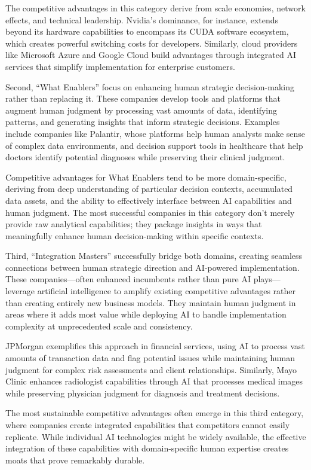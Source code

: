 \documentclass[
  Letterpaper,
]{scrbook}
\begin{document}
The competitive advantages in this category derive from scale economies,
network effects, and technical leadership. Nvidia's dominance, for
instance, extends beyond its hardware capabilities to encompass its CUDA
software ecosystem, which creates powerful switching costs for
developers. Similarly, cloud providers like Microsoft Azure and Google
Cloud build advantages through integrated AI services that simplify
implementation for enterprise customers.

Second, ``What Enablers'' focus on enhancing human strategic
decision-making rather than replacing it. These companies develop tools
and platforms that augment human judgment by processing vast amounts of
data, identifying patterns, and generating insights that inform
strategic decisions. Examples include companies like Palantir, whose
platforms help human analysts make sense of complex data environments,
and decision support tools in healthcare that help doctors identify
potential diagnoses while preserving their clinical judgment.

Competitive advantages for What Enablers tend to be more
domain-specific, deriving from deep understanding of particular decision
contexts, accumulated data assets, and the ability to effectively
interface between AI capabilities and human judgment. The most
successful companies in this category don't merely provide raw
analytical capabilities; they package insights in ways that meaningfully
enhance human decision-making within specific contexts.

Third, ``Integration Masters'' successfully bridge both domains,
creating seamless connections between human strategic direction and
AI-powered implementation. These companies---often enhanced incumbents
rather than pure AI plays---leverage artificial intelligence to amplify
existing competitive advantages rather than creating entirely new
business models. They maintain human judgment in areas where it adds
most value while deploying AI to handle implementation complexity at
unprecedented scale and consistency.

JPMorgan exemplifies this approach in financial services, using AI to
process vast amounts of transaction data and flag potential issues while
maintaining human judgment for complex risk assessments and client
relationships. Similarly, Mayo Clinic enhances radiologist capabilities
through AI that processes medical images while preserving physician
judgment for diagnosis and treatment decisions.

The most sustainable competitive advantages often emerge in this third
category, where companies create integrated capabilities that
competitors cannot easily replicate. While individual AI technologies
might be widely available, the effective integration of these
capabilities with domain-specific human expertise creates moats that
prove remarkably durable.
\end{document}
